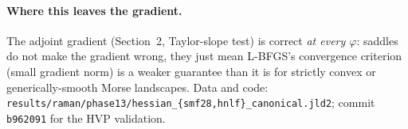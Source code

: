\documentclass[11pt]{article}
\begin{document}
\paragraph{Where this leaves the gradient.}
The adjoint gradient (Section~2, Taylor-slope test) is correct
\emph{at every $\varphi$}: saddles do not make the gradient wrong, they just
mean L-BFGS's convergence criterion (small gradient norm) is a weaker
guarantee than it is for strictly convex or generically-smooth Morse
landscapes. Data and code:
\texttt{results/raman/phase13/hessian\_\{smf28,hnlf\}\_canonical.jld2};
commit \texttt{b962091} for the HVP validation.
\end{document}
